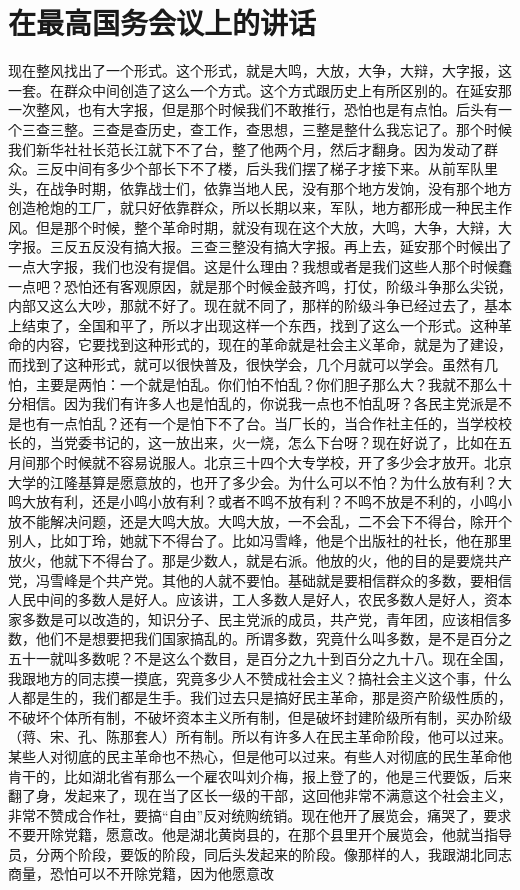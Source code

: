 \section[在最高国务会议上的讲话（一九五七年十月十三日）]{在最高国务会议上的讲话}


现在整风找出了一个形式。这个形式，就是大鸣，大放，大争，大辩，大字报，这一套。在群众中间创造了这么一个方式。这个方式跟历史上有所区别的。在延安那一次整风，也有大字报，但是那个时候我们不敢推行，恐怕也是有点怕。后头有一个三查三整。三查是查历史，查工作，查思想，三整是整什么我忘记了。那个时候我们新华社社长范长江就下不了台，整了他两个月，然后才翻身。因为发动了群众。三反中间有多少个部长下不了楼，后头我们摆了梯子才接下来。从前军队里头，在战争时期，依靠战士们，依靠当地人民，没有那个地方发饷，没有那个地方创造枪炮的工厂，就只好依靠群众，所以长期以来，军队，地方都形成一种民主作风。但是那个时候，整个革命时期，就没有现在这个大放，大鸣，大争，大辩，大字报。三反五反没有搞大报。三查三整没有搞大字报。再上去，延安那个时候出了一点大字报，我们也没有提倡。这是什么理由？我想或者是我们这些人那个时候蠢一点吧？恐怕还有客观原因，就是那个时候金鼓齐鸣，打仗，阶级斗争那么尖锐，内部又这么大吵，那就不好了。现在就不同了，那样的阶级斗争已经过去了，基本上结束了，全国和平了，所以才出现这样一个东西，找到了这么一个形式。这种革命的内容，它要找到这种形式的，现在的革命就是社会主义革命，就是为了建设，而找到了这种形式，就可以很快普及，很快学会，几个月就可以学会。虽然有几怕，主要是两怕：一个就是怕乱。你们怕不怕乱？你们胆子那么大？我就不那么十分相信。因为我们有许多人也是怕乱的，你说我一点也不怕乱呀？各民主党派是不是也有一点怕乱？还有一个是怕下不了台。当厂长的，当合作社主任的，当学校校长的，当党委书记的，这一放出来，火一烧，怎么下台呀？现在好说了，比如在五月间那个时候就不容易说服人。北京三十四个大专学校，开了多少会才放开。北京大学的江隆基算是愿意放的，也开了多少会。为什么可以不怕？为什么放有利？大鸣大放有利，还是小鸣小放有利？或者不鸣不放有利？不鸣不放是不利的，小鸣小放不能解决问题，还是大鸣大放。大鸣大放，一不会乱，二不会下不得台，除开个别人，比如丁玲，她就下不得台了。比如冯雪峰，他是个出版社的社长，他在那里放火，他就下不得台了。那是少数人，就是右派。他放的火，他的目的是要烧共产党，冯雪峰是个共产党。其他的人就不要怕。基础就是要相信群众的多数，要相信人民中间的多数人是好人。应该讲，工人多数人是好人，农民多数人是好人，资本家多数是可以改造的，知识分子、民主党派的成员，共产党，青年团，应该相信多数，他们不是想要把我们国家搞乱的。所谓多数，究竟什么叫多数，是不是百分之五十一就叫多数呢？不是这么个数目，是百分之九十到百分之九十八。现在全国，我跟地方的同志摸一摸底，究竟多少人不赞成社会主义？搞社会主义这个事，什么人都是生的，我们都是生手。我们过去只是搞好民主革命，那是资产阶级性质的，不破坏个体所有制，不破坏资本主义所有制，但是破坏封建阶级所有制，买办阶级（蒋、宋、孔、陈那套人）所有制。所以有许多人在民主革命阶段，他可以过来。某些人对彻底的民主革命也不热心，但是他可以过来。有些人对彻底的民生革命他肯干的，比如湖北省有那么一个雇农叫刘介梅，报上登了的，他是三代要饭，后来翻了身，发起来了，现在当了区长一级的干部，这回他非常不满意这个社会主义，非常不赞成合作社，要搞“自由”反对统购统销。现在他开了展览会，痛哭了，要求不要开除党籍，愿意改。他是湖北黄岗县的，在那个县里开个展览会，他就当指导员，分两个阶段，要饭的阶段，同后头发起来的阶段。像那样的人，我跟湖北同志商量，恐怕可以不开除党籍，因为他愿意改